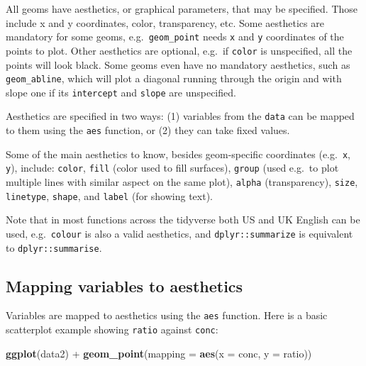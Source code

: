 \documentclass[]{book}
\newenvironment{Shaded}{}{}
\newcommand{\DataTypeTok}[1]{\textcolor[rgb]{0.56,0.13,0.00}{#1}}
\newcommand{\KeywordTok}[1]{\textcolor[rgb]{0.00,0.44,0.13}{\textbf{#1}}}
\newcommand{\NormalTok}[1]{#1}
\newcommand{\OperatorTok}[1]{\textcolor[rgb]{0.40,0.40,0.40}{#1}}
\newcommand{\StringTok}[1]{\textcolor[rgb]{0.25,0.44,0.63}{#1}}
\begin{document}
All geoms have aesthetics, or graphical parameters, that may be specified. Those include x and y coordinates, color, transparency, etc. Some aesthetics are mandatory for some geoms, e.g.~\texttt{geom\_point} needs \texttt{x} and \texttt{y} coordinates of the points to plot. Other aesthetics are optional, e.g.~if \texttt{color} is unspecified, all the points will look black. Some geoms even have no mandatory aesthetics, such as \texttt{geom\_abline}, which will plot a diagonal running through the origin and with slope one if its \texttt{intercept} and \texttt{slope} are unspecified.

Aesthetics are specified in two ways: (1) variables from the \texttt{data} can be mapped to them using the \texttt{aes} function, or (2) they can take fixed values.

Some of the main aesthetics to know, besides geom-specific coordinates (e.g.~\texttt{x}, \texttt{y}), include: \texttt{color}, \texttt{fill} (color used to fill surfaces), \texttt{group} (used e.g.~to plot multiple lines with similar aspect on the same plot), \texttt{alpha} (transparency), \texttt{size}, \texttt{linetype}, \texttt{shape}, and \texttt{label} (for showing text).

Note that in most functions across the tidyverse both US and UK English can be used, e.g.~\texttt{colour} is also a valid aesthetics, and \texttt{dplyr::summarize} is equivalent to \texttt{dplyr::summarise}.

\hypertarget{mapping-variables-to-aesthetics}{%
\subsection{Mapping variables to aesthetics}\label{mapping-variables-to-aesthetics}}

Variables are mapped to aesthetics using the \texttt{aes} function. Here is a basic scatterplot example showing \texttt{ratio} against \texttt{conc}:

\begin{Shaded}
\begin{Highlighting}[]
\KeywordTok{ggplot}\NormalTok{(data2) }\OperatorTok{+}
\StringTok{  }\KeywordTok{geom_point}\NormalTok{(}\DataTypeTok{mapping =} \KeywordTok{aes}\NormalTok{(}\DataTypeTok{x =}\NormalTok{ conc, }\DataTypeTok{y =}\NormalTok{ ratio))}
\end{Highlighting}
\end{Shaded}
\end{document}
